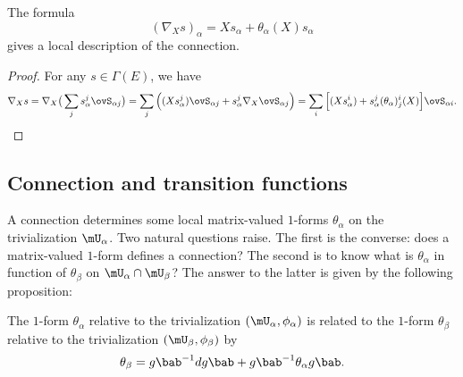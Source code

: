 \begin{proposition}	\label{PropFormnabXthe}\label{prop:namba_theta_u}   %
The formula
\begin{equation}\label{eq:nab_theta}
   (\nabla_Xs)_{\alpha}=Xs_{\alpha}+\theta_{\alpha}(X)s_{\alpha}
\end{equation}
gives a local description of the connection.
\end{proposition}

\begin{proof}
For any $s\in\Gamma(E)$, we have
\begin{equation}
\nabla_Xs=\nabla_X\big(  \sum_j s^j_{\alpha}\ovS_{\alpha j}  \big)
         =\sum_j\Big(  (Xs_{\alpha}^j)\ovS_{\alpha j} + s^j_{\alpha}\nabla_X\ovS_{\alpha j}     \Big)
	 =\sum_i\Big[   (Xs_{\alpha}^i)+s_{\alpha}^j(\theta_{\alpha})_j^i(X)  \Big]\ovS_{\alpha i}.
\end{equation}
\end{proof}

\subsection{Connection and transition functions}

A connection determines some local matrix-valued $1$-forms $\theta_{\alpha}$ on the trivialization $\mU_{\alpha}$. Two natural questions raise. The first is the converse: does a matrix-valued $1$-form defines a connection? The second is to know  what is $\theta_{\alpha}$ in function of $\theta_{\beta}$ on $\mU_{\alpha}\cap\mU_{\beta}$? The answer to the latter is  given by the following proposition:

\begin{proposition}
The $1$-form $\theta_{\alpha}$ relative to the trivialization $(\mU_{\alpha},\phi_{\alpha})$ is related to the $1$-form $\theta_{\beta}$ relative to the trivialization $(\mU_{\beta},\phi_{\beta})$ by
\begin{equation}\label{eq:theta_g}
  \theta_{\beta}=g\bab^{-1} dg\bab+g\bab^{-1}\theta_{\alpha} g\bab.
\end{equation}
\end{proposition}


